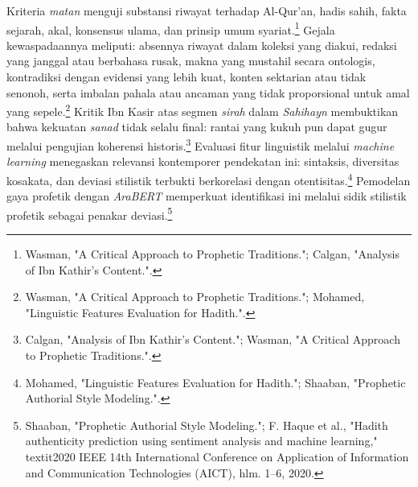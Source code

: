 Kriteria \textit{matan} menguji substansi riwayat terhadap Al-Qur'an, hadis sahih, fakta sejarah, akal, konsensus ulama, dan prinsip umum syariat.\footnote{Wasman, "A Critical Approach to Prophetic Traditions."; Calgan, "Analysis of Ibn Kathir's Content.".} Gejala kewaspadaannya meliputi: absennya riwayat dalam koleksi yang diakui, redaksi yang janggal atau berbahasa rusak, makna yang mustahil secara ontologis, kontradiksi dengan evidensi yang lebih kuat, konten sektarian atau tidak senonoh, serta imbalan pahala atau ancaman yang tidak proporsional untuk amal yang sepele.\footnote{Wasman, "A Critical Approach to Prophetic Traditions."; Mohamed, "Linguistic Features Evaluation for Hadith.".} Kritik Ibn Kasir atas segmen \textit{sirah} dalam \textit{Sahihayn} membuktikan bahwa kekuatan \textit{sanad} tidak selalu final: rantai yang kukuh pun dapat gugur melalui pengujian koherensi historis.\footnote{Calgan, "Analysis of Ibn Kathir's Content."; Wasman, "A Critical Approach to Prophetic Traditions.".} Evaluasi fitur linguistik melalui \textit{machine learning} menegaskan relevansi kontemporer pendekatan ini: sintaksis, diversitas kosakata, dan deviasi stilistik terbukti berkorelasi dengan otentisitas.\footnote{Mohamed, "Linguistic Features Evaluation for Hadith."; Shaaban, "Prophetic Authorial Style Modeling.".} Pemodelan gaya profetik dengan \textit{AraBERT} memperkuat identifikasi ini melalui sidik stilistik profetik sebagai penakar deviasi.\footnote{Shaaban, "Prophetic Authorial Style Modeling."; F. Haque et al., "Hadith authenticity prediction using sentiment analysis and machine learning," \\textit{2020 IEEE 14th International Conference on Application of Information and Communication Technologies (AICT)}, hlm. 1--6, 2020.}

